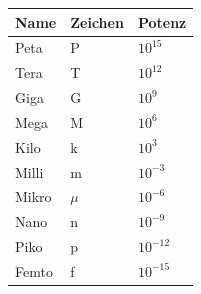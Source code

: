 \documentclass[8pt]{extarticle}
\begin{document}
\begin{minipage}{0.33\textwidth}
\begin{tabular}{| l l l |}
	\hline
	Name & Zeichen & Potenz\\[0.5ex]
	\hline
	\hline
	Peta & P & $10^{15}$\\
	\hline
	Tera & T & $10^{12}$\\
	\hline
	Giga & G & $10^9$\\
	\hline
	Mega & M & $10^6$\\
	\hline
	Kilo & k & $10^3$\\[0.5ex]
	\hline
	\hline
	Milli & m & $10^{-3}$\\
	\hline
	Mikro & $\mu$ & $10^{-6}$\\
	\hline
	Nano & n & $10^{-9}$\\
	\hline
	Piko & p & $10^{-12}$\\
	\hline
	Femto & f & $10^{-15}$\\
	\hline
\end{tabular}

\end{minipage}%

\newpage
\end{document}
